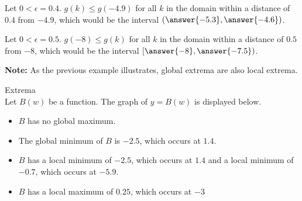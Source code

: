 \documentclass{ximera}
\begin{document}
Let $0 < \epsilon = 0.4$.  $g(k) \leq g(-4.9)$ for all $k$ in the domain within a distance of $0.4$ from $-4.9$, which would be the interval $\left(\answer{-5.3}, \answer{-4.6}\right)$.

Let $0 < \epsilon = 0.5$.  $g(-8) \leq g(k)$ for all $k$ in the domain within a distance of $0.5$ from $-8$, which would be the interval $\left[\answer{-8}, \answer{-7.5}\right)$.


\textbf{Note:} As the previous example illustrates, global extrema are also local extrema.



\begin{example} Extrema \\

Let $B(w)$ be a function.  The graph of $y = B(w)$ is displayed below. 

\begin{image}
\end{image}

\begin{itemize}
\item $B$ has no global maximum.
\item The global minimum of $B$ is $-2.5$, which occurs at $1.4$.
\item $B$ has a local minimum of $-2.5$, which occurs at $1.4$ and a local minimum of $-0.7$, which occurs at $-5.9$.
\item $B$ has a local maximum of $0.25$, which occurs at $-3$
\end{itemize}

\end{example}
\end{document}
